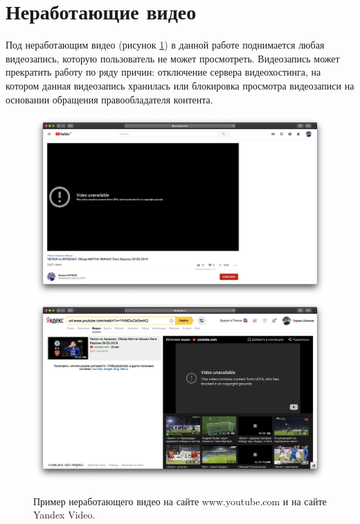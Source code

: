 \section{Неработающие видео}

Под неработающим видео (рисунок \ref{fig:bad_video}) в данной работе поднимается любая видеозапись, которую пользователь не может просмотреть. Видеозапись может прекратить работу по ряду причин: отключение сервера видеохостинга, на котором данная видеозапись хранилась или блокировка просмотра видеозаписи на основании обращения правообладателя контента.

\begin{figure}
    \centering
    \includegraphics[width=\textwidth]{../images/youtube_bad.png}
    \includegraphics[width=\textwidth]{../images/yandex_video_bad.png}
    \caption{Пример неработающего видео на сайте www.youtube.com и на сайте Yandex Video.}
    \label{fig:bad_video}
\end{figure}
